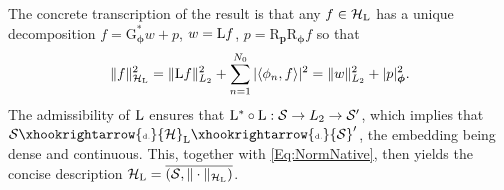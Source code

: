 \documentclass[11pt, english,english]{article}
\newcommand{\Lop}{{\rm L}}
\def\V#1{{\boldsymbol{#1}}}         %
\def\Spc#1{{\mathcal{#1}}}  %
\def\Op#1{{\mathrm{#1}}}  %
\def\Identity{\mathrm{Id}} %
\newcommand{\embedD}{\xhookrightarrow{\mbox{\tiny \rm d.}}}
\renewcommand{\[}{\begin{equation}}
\renewcommand{\]}[1]{\label{eq:#1}\end{equation}}
\begin{document}
The concrete transcription of the result is that any $f \in \Spc H_\Lop$ has a unique decomposition
$f=\Op G_\V \phi^\ast w + p$, %
$w=\Lop f$, $p=\Op R_{\V p}\Op R_{\V \phi}f$ so that
\begin{align}
\label{Eq:NormNative}\|f\|^2_{\Spc H_\Lop}=\|\Lop f\|^2_{L_2}+\sum_{n=1}^{N_0} |\langle \phi_n,f\rangle|^2=\|w\|^2_{L_2}+|p|^2_{\V \phi}.
\end{align}
The admissibility of $\Lop$ ensures that $\Lop^\ast\circ \Lop: \Spc S \to L_2 \to \Spc S'$, which implies that $\Spc S \embedD \Spc H_\Lop \embedD \Spc S'$, the embedding being dense and continuous. This, together with \eqref{Eq:NormNative}, then yields the concise description %
$\Spc H_\Lop=\overline{(\Spc S,\|\cdot\|_{\Spc H_\Lop})}$.
\end{document}
